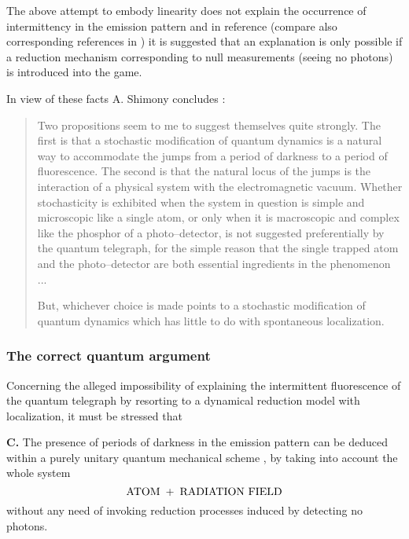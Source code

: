 \documentclass[10pt,a4paper]{article}
\begin{document}
The above attempt to embody linearity does not explain the
occurrence of intermittency in the emission pattern and in
reference \cite{mp} (compare also corresponding references in
\cite{shi90}) it is suggested that an explanation is only possible
if a reduction mechanism corresponding to null measurements
(seeing no photons) is introduced into the game.

In view of these facts A. Shimony concludes \cite{shi90}:
\begin{quotation}
Two propositions seem to me to suggest themselves quite strongly.
The first is that a stochastic modification of quantum dynamics is
a natural way to accommodate the jumps from a period of darkness
to a period of fluorescence. The second is that the natural locus
of the jumps is the interaction of a physical system with the
electromagnetic vacuum. Whether stochasticity is exhibited when
the system in question is simple and microscopic like a single
atom, or only when it is macroscopic and complex like the phosphor
of a photo--detector, is not suggested preferentially by the
quantum telegraph, for the simple reason that the single trapped
atom and the photo--detector are both essential ingredients in the
phenomenon ...

But, whichever choice is made points to a stochastic modification
of quantum dynamics which has little to do with spontaneous
localization.
\end{quotation}

\subsubsection{The correct quantum argument} \label{sec1523}

Concerning the alleged impossibility of explaining the
intermittent fluorescence of the quantum telegraph by resorting to
a dynamical reduction model with localization, it must be stressed
that

{\bf C.} The presence of periods of darkness in the emission
pattern can be deduced within a purely unitary quantum mechanical
scheme \cite{ctd}, by taking into account the whole system
\[
\makebox{ATOM} \; + \; \makebox{RADIATION FIELD}
\]
without any need of invoking reduction processes induced by
detecting no photons.
\end{document}
